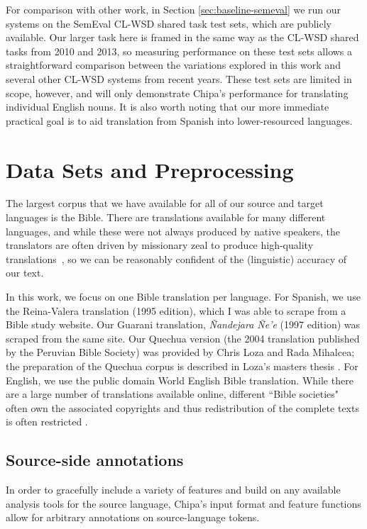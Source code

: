 For comparison with other work, in Section \ref{sec:baseline-semeval} we run
our systems on the SemEval CL-WSD shared task test sets, which are publicly
available.  Our larger task here is framed in the same way as the CL-WSD shared
tasks from 2010 and 2013, so measuring performance on these test sets allows a
straightforward comparison between the variations explored in this work and
several other CL-WSD systems from recent years. These test sets are limited in
scope, however, and will only demonstrate Chipa's performance for translating
individual English nouns. It is also worth noting that our more immediate
practical goal is to aid translation from Spanish into lower-resourced
languages. 

\section{Data Sets and Preprocessing}
The largest corpus that we have available for all of our source and target
languages is the Bible. There are translations available for many different
languages, and while these were not always produced by native speakers, the
translators are often driven by missionary zeal to produce high-quality
translations~\cite{DBLP:journals/lre/ResnikOD99}, so we can be reasonably
confident of the (linguistic) accuracy of our text.

In this work, we focus on one Bible translation per language. For Spanish, we
use the Reina-Valera translation (1995 edition), which I was able to scrape
from a Bible study website. Our Guarani translation, \emph{Ñandejara Ñe'e}
(1997 edition) was scraped from the same site. Our Quechua version (the 2004
translation published by the Peruvian Bible Society) was provided by Chris Loza
and Rada Mihalcea; the preparation of the Quechua corpus is described in Loza's
masters thesis \cite{chrisloza}. For English, we use the public domain World
English Bible translation.
While there are a large number of translations available online, different
``Bible societies" often own the associated copyrights and thus redistribution
of the complete texts is often restricted \cite{MAYER14.220.L14-1215}.

\subsection{Source-side annotations}
\label{sec:annotations}
In order to gracefully include a variety of features and build on
any available analysis tools for the source language, Chipa's input format and
feature functions allow for arbitrary annotations on source-language tokens.

